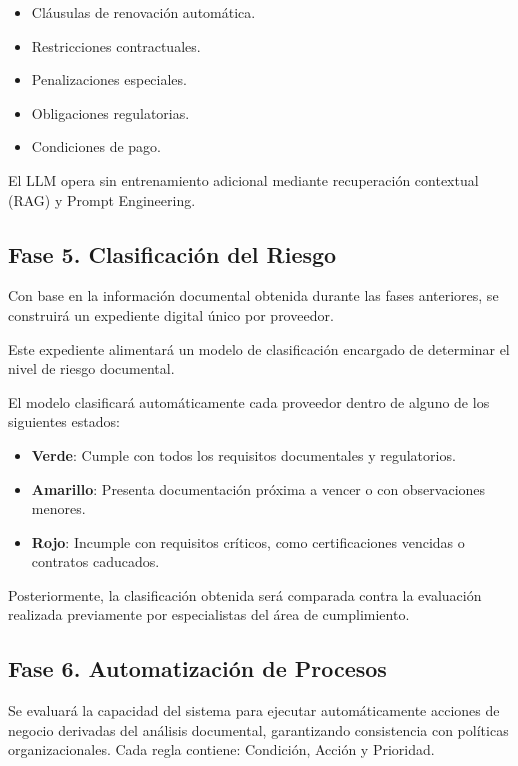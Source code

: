 \documentclass[12pt]{article}
\begin{document}
\begin{itemize}
    \item Cláusulas de renovación automática.
    \item Restricciones contractuales.
    \item Penalizaciones especiales.
    \item Obligaciones regulatorias.
    \item Condiciones de pago.
\end{itemize}

El LLM opera sin entrenamiento adicional mediante recuperación contextual (RAG) y Prompt Engineering.

\subsection{Fase 5. Clasificación del Riesgo}

Con base en la información documental obtenida durante las fases anteriores, se construirá un expediente digital único por proveedor.

Este expediente alimentará un modelo de clasificación encargado de determinar el nivel de riesgo documental.

El modelo clasificará automáticamente cada proveedor dentro de alguno de los siguientes estados:

\begin{itemize}
    \item \textbf{Verde}: Cumple con todos los requisitos documentales y regulatorios.
    \item \textbf{Amarillo}: Presenta documentación próxima a vencer o con observaciones menores.
    \item \textbf{Rojo}: Incumple con requisitos críticos, como certificaciones vencidas o contratos caducados.
\end{itemize}

Posteriormente, la clasificación obtenida será comparada contra la evaluación realizada previamente por especialistas del área de cumplimiento.

\subsection{Fase 6. Automatización de Procesos}
Se evaluará la capacidad del sistema para ejecutar automáticamente acciones de negocio derivadas del análisis documental, garantizando consistencia con políticas organizacionales. Cada regla contiene: Condición, Acción y Prioridad.
\end{document}
